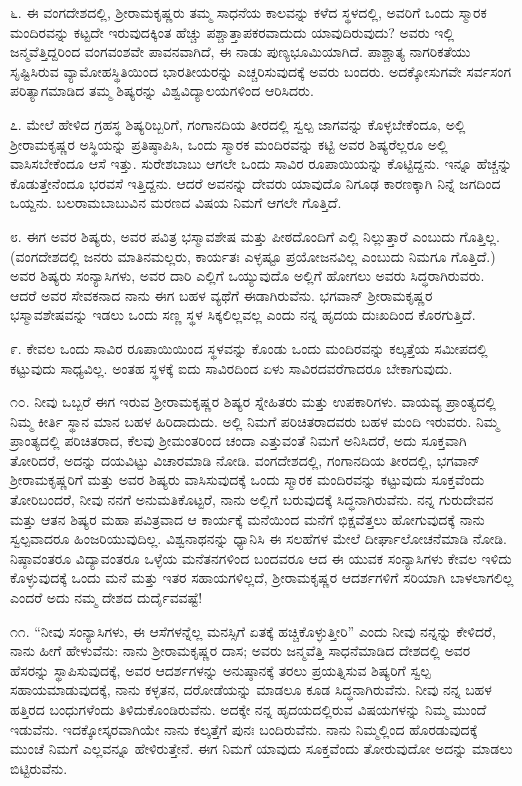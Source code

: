 ೬. ಈ ವಂಗದೇಶದಲ್ಲಿ, ಶ‍್ರೀರಾಮಕೃಷ್ಣರು ತಮ್ಮ ಸಾಧನೆಯ ಕಾಲವನ್ನು ಕಳೆದ ಸ್ಥಳದಲ್ಲಿ, ಅವರಿಗೆ ಒಂದು ಸ್ಮಾರಕ ಮಂದಿರವನ್ನು ಕಟ್ಟದೇ ಇರುವುದಕ್ಕಿಂತ ಹೆಚ್ಚು ಪಶ್ಚಾತ್ತಾಪಕರವಾದುದು ಯಾವುದಿರುವುದು? ಅವರು ಇಲ್ಲಿ ಜನ್ಮವೆತ್ತಿದ್ದರಿಂದ ವಂಗವಂಶವೇ ಪಾವನವಾಗಿದೆ, ಈ ನಾಡು ಪುಣ್ಯಭೂಮಿಯಾಗಿದೆ. ಪಾಶ್ಚಾತ್ಯ ನಾಗರಿಕತೆಯು ಸೃಷ್ಟಿಸಿರುವ ವ್ಯಾಮೋಹಸ್ಥಿತಿಯಿಂದ ಭಾರತೀಯರನ್ನು ಎಚ್ಚರಿಸುವುದಕ್ಕೆ ಅವರು ಬಂದರು. ಅದಕ್ಕೋಸುಗವೇ ಸರ್ವಸಂಗ ಪರಿತ್ಯಾಗಮಾಡಿದ ತಮ್ಮ ಶಿಷ್ಯರನ್ನು ವಿಶ್ವವಿದ್ಯಾಲಯಗಳಿಂದ ಆರಿಸಿದರು.

೭. ಮೇಲೆ ಹೇಳಿದ ಗ್ರಹಸ್ಥ ಶಿಷ್ಯರಿಬ್ಬರಿಗೆ, ಗಂಗಾನದಿಯ ತೀರದಲ್ಲಿ ಸ್ವಲ್ಪ ಜಾಗವನ್ನು ಕೊಳ್ಳಬೇಕೆಂದೂ, ಅಲ್ಲಿ ಶ‍್ರೀರಾಮಕೃಷ್ಣರ ಅಸ್ಥಿಯನ್ನು ಪ್ರತಿಷ್ಠಾಪಿಸಿ, ಒಂದು ಸ್ಮಾರಕ ಮಂದಿರವನ್ನು ಕಟ್ಟಿ ಅವರ ಶಿಷ್ಯರೆಲ್ಲರೂ ಅಲ್ಲಿ ವಾಸಿಸಬೇಕೆಂದೂ ಆಸೆ ಇತ್ತು. ಸುರೇಶಬಾಬು ಆಗಲೇ ಒಂದು ಸಾವಿರ ರೂಪಾಯಿಯನ್ನು ಕೊಟ್ಟಿದ್ದನು. ಇನ್ನೂ ಹೆಚ್ಚನ್ನು ಕೊಡುತ್ತೇನೆಂದೂ ಭರವಸೆ ಇತ್ತಿದ್ದನು. ಆದರೆ ಅವನನ್ನು ದೇವರು ಯಾವುದೊ ನಿಗೂಢ ಕಾರಣಕ್ಕಾಗಿ ನಿನ್ನೆ ಜಗದಿಂದ ಒಯ್ದನು. ಬಲರಾಮಬಾಬುವಿನ ಮರಣದ ವಿಷಯ ನಿಮಗೆ ಆಗಲೇ ಗೊತ್ತಿದೆ.

೮. ಈಗ ಅವರ ಶಿಷ್ಯರು, ಅವರ ಪವಿತ್ರ ಭಸ್ಮಾವಶೇಷ ಮತ್ತು ಪೀಠದೊಂದಿಗೆ ಎಲ್ಲಿ ನಿಲ್ಲುತ್ತಾರೆ ಎಂಬುದು ಗೊತ್ತಿಲ್ಲ. (ವಂಗದೇಶದಲ್ಲಿ ಜನರು ಮಾತಿನಮಲ್ಲರು, ಕಾರ್ಯತಃ ಎಳ್ಳಷ್ಟೂ ಪ್ರಯೋಜನವಿಲ್ಲ ಎಂಬುದು ನಿಮಗೂ ಗೊತ್ತಿದೆ.) ಅವರ ಶಿಷ್ಯರು ಸಂನ್ಯಾಸಿಗಳು, ಅವರ ದಾರಿ ಎಲ್ಲಿಗೆ ಒಯ್ಯುವುದೊ ಅಲ್ಲಿಗೆ ಹೋಗಲು ಅವರು ಸಿದ್ಧರಾಗಿರುವರು. ಆದರೆ ಅವರ ಸೇವಕನಾದ ನಾನು ಈಗ ಬಹಳ ವ್ಯಥೆಗೆ ಈಡಾಗಿರುವೆನು. ಭಗವಾನ್ ಶ‍್ರೀರಾಮಕೃಷ್ಣರ ಭಸ್ಮಾವಶೇಷವನ್ನು ಇಡಲು ಒಂದು ಸಣ್ಣ ಸ್ಥಳ ಸಿಕ್ಕಲಿಲ್ಲವಲ್ಲ ಎಂದು ನನ್ನ ಹೃದಯ ದುಃಖದಿಂದ ಕೊರಗುತ್ತಿದೆ.

೯. ಕೇವಲ ಒಂದು ಸಾವಿರ ರೂಪಾಯಿಯಿಂದ ಸ್ಥಳವನ್ನು ಕೊಂಡು ಒಂದು ಮಂದಿರವನ್ನು ಕಲ್ಕತ್ತೆಯ ಸಮೀಪದಲ್ಲಿ ಕಟ್ಟುವುದು ಸಾಧ್ಯವಿಲ್ಲ. ಅಂತಹ ಸ್ಥಳಕ್ಕೆ ಐದು ಸಾವಿರದಿಂದ ಏಳು ಸಾವಿರದವರೆಗಾದರೂ ಬೇಕಾಗುವುದು.

೧೦. ನೀವು ಒಬ್ಬರೆ ಈಗ ಇರುವ ಶ‍್ರೀರಾಮಕೃಷ್ಣರ ಶಿಷ್ಯರ ಸ್ನೇಹಿತರು ಮತ್ತು ಉಪಕಾರಿಗಳು. ವಾಯವ್ಯ ಪ್ರಾಂತ್ಯದಲ್ಲಿ ನಿಮ್ಮ ಕೀರ್ತಿ ಸ್ಥಾನ ಮಾನ ಬಹಳ ಹಿರಿದಾದುದು. ಅಲ್ಲಿ ನಿಮಗೆ ಪರಿಚಿತರಾದವರು ಬಹಳ ಮಂದಿ ಇರುವರು. ನಿಮ್ಮ ಪ್ರಾಂತ್ಯದಲ್ಲಿ ಪರಿಚಿತರಾದ, ಕೆಲವು ಶ‍್ರೀಮಂತರಿಂದ ಚಂದಾ ಎತ್ತುವಂತೆ ನಿಮಗೆ ಅನಿಸಿದರೆ, ಅದು ಸೂಕ್ತವಾಗಿ ತೋರಿದರೆ, ಅದನ್ನು ದಯವಿಟ್ಟು ವಿಚಾರಮಾಡಿ ನೋಡಿ. ವಂಗದೇಶದಲ್ಲಿ, ಗಂಗಾನದಿಯ ತೀರದಲ್ಲಿ, ಭಗವಾನ್ ಶ‍್ರೀರಾಮಕೃಷ್ಣರಿಗೆ ಮತ್ತು ಅವರ ಶಿಷ್ಯರು ವಾಸಿಸುವುದಕ್ಕೆ ಒಂದು ಸ್ಮಾರಕ ಮಂದಿರವನ್ನು ಕಟ್ಟುವುದು ಸೂಕ್ತವೆಂದು ತೋರಿಬಂದರೆ, ನೀವು ನನಗೆ ಅನುಮತಿಕೊಟ್ಟರೆ, ನಾನು ಅಲ್ಲಿಗೆ ಬರುವುದಕ್ಕೆ ಸಿದ್ಧನಾಗಿರುವೆನು. ನನ್ನ ಗುರುದೇವನ ಮತ್ತು ಆತನ ಶಿಷ್ಯರ ಮಹಾ ಪವಿತ್ರವಾದ ಆ ಕಾರ್ಯಕ್ಕೆ ಮನೆಯಿಂದ ಮನೆಗೆ ಭಿಕ್ಷವೆತ್ತಲು ಹೋಗುವುದಕ್ಕೆ ನಾನು ಸ್ವಲ್ಪವಾದರೂ ಹಿಂಜರಿಯುವುದಿಲ್ಲ. ವಿಶ್ವನಾಥನನ್ನು ಧ್ಯಾನಿಸಿ ಈ ಸಲಹೆಗಳ ಮೇಲೆ ದೀರ್ಘಾಲೋಚನೆಮಾಡಿ ನೋಡಿ. ನಿಷ್ಠಾವಂತರೂ ವಿದ್ಯಾವಂತರೂ ಒಳ್ಳೆಯ ಮನೆತನಗಳಿಂದ ಬಂದವರೂ ಆದ ಈ ಯುವಕ ಸಂನ್ಯಾಸಿಗಳು ಕೇವಲ ಇಳಿದು ಕೊಳ್ಳುವುದಕ್ಕೆ ಒಂದು ಮನೆ ಮತ್ತು ಇತರ ಸಹಾಯಗಳಿಲ್ಲದೆ, ಶ‍್ರೀರಾಮಕೃಷ್ಣರ ಆದರ್ಶಗಳಿಗೆ ಸರಿಯಾಗಿ ಬಾಳಲಾಗಲಿಲ್ಲ ಎಂದರೆ ಅದು ನಮ್ಮ ದೇಶದ ದುರ್ದೈವವಷ್ಟೆ!

೧೧. “ನೀವು ಸಂನ್ಯಾಸಿಗಳು, ಈ ಆಸೆಗಳನ್ನೆಲ್ಲ ಮನಸ್ಸಿಗೆ ಏತಕ್ಕೆ ಹಚ್ಚಿಕೊಳ್ಳುತ್ತೀರಿ” ಎಂದು ನೀವು ನನ್ನನ್ನು ಕೇಳಿದರೆ, ನಾನು ಹೀಗೆ ಹೇಳುವೆನು: ನಾನು ಶ‍್ರೀರಾಮಕೃಷ್ಣರ ದಾಸ; ಅವರು ಜನ್ಮವೆತ್ತಿ ಸಾಧನೆಮಾಡಿದ ದೇಶದಲ್ಲಿ ಅವರ ಹೆಸರನ್ನು ಸ್ಥಾಪಿಸುವುದಕ್ಕೆ, ಅವರ ಆದರ್ಶಗಳನ್ನು ಅನುಷ್ಠಾನಕ್ಕೆ ತರಲು ಪ್ರಯತ್ನಿಸುವ ಶಿಷ್ಯರಿಗೆ ಸ್ವಲ್ಪ ಸಹಾಯಮಾಡುವುದಕ್ಕೆ, ನಾನು ಕಳ್ಳತನ, ದರೋಡೆಯನ್ನು ಮಾಡಲೂ ಕೂಡ ಸಿದ್ಧನಾಗಿರುವೆನು. ನೀವು ನನ್ನ ಬಹಳ ಹತ್ತಿರದ ಬಂಧುಗಳೆಂದು ತಿಳಿದುಕೊಂಡಿರುವೆನು. ಅದಕ್ಕೇ ನನ್ನ ಹೃದಯದಲ್ಲಿರುವ ವಿಷಯಗಳನ್ನು ನಿಮ್ಮ ಮುಂದೆ ಇಡುವೆನು. ಇದಕ್ಕೋಸ್ಕರವಾಗಿಯೇ ನಾನು ಕಲ್ಕತ್ತೆಗೆ ಪುನಃ ಬಂದಿರುವೆನು. ನಾನು ನಿಮ್ಮಲ್ಲಿಂದ ಹೊರಡುವುದಕ್ಕೆ ಮುಂಚೆ ನಿಮಗೆ ಎಲ್ಲವನ್ನೂ ಹೇಳಿರುತ್ತೇನೆ. ಈಗ ನಿಮಗೆ ಯಾವುದು ಸೂಕ್ತವೆಂದು ತೋರುವುದೋ ಅದನ್ನು ಮಾಡಲು ಬಿಟ್ಟಿರುವೆನು.

